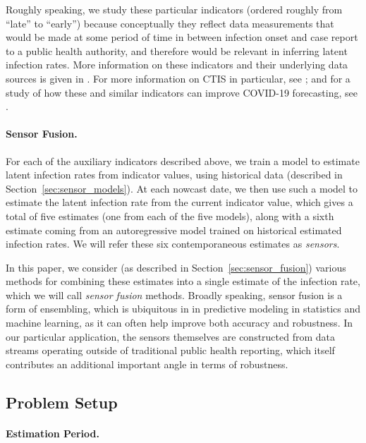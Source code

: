 \documentclass[sts]{imsart}
\theoremstyle{plain}
\theoremstyle{definition}
\theoremstyle{remark}
\begin{document}
Roughly speaking, we study these particular indicators (ordered roughly from
``late'' to ``early'') because conceptually they reflect data measurements that
would be made at some period of time in between infection onset and case report
to a public health authority, and therefore would be relevant in inferring
latent infection rates. More information on these indicators and their
underlying data sources is given in \citet{Reinhart:2021}. For more information
on CTIS in particular, see \citet{Salomon:2021}; and for a study of how these
and similar indicators can improve COVID-19 forecasting, see
\citet{McDonald:2021}.

\smallskip
\paragraph*{Sensor Fusion.}  

For each of the auxiliary indicators described above, we train a model to
estimate latent infection rates from indicator values, using historical data
(described in Section~\ref{sec:sensor_models}). At each nowcast date, we then  
use such a model to estimate the latent infection rate from the current
indicator value, which gives a total of five estimates (one from each of the
five models), along with a sixth estimate coming from an autoregressive model 
trained on historical estimated infection rates. We will refer these six 
contemporaneous estimates as \emph{sensors}.

In this paper, we consider (as described in Section~\ref{sec:sensor_fusion})
various methods for combining these estimates into a single estimate of the  
infection rate, which we will call \emph{sensor fusion} methods. Broadly
speaking, sensor fusion is a form of ensembling, which is ubiquitous in in
predictive modeling in statistics and machine learning, as it can often help
improve both accuracy and robustness. In our particular application, the sensors
themselves are constructed from data streams operating outside of traditional
public health reporting, which itself contributes an additional important angle
in terms of robustness. %

\subsection{Problem Setup}
\label{sec:problem_setup}

\paragraph*{Estimation Period.}
\end{document}
